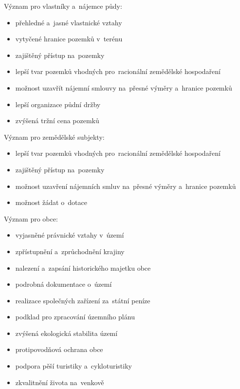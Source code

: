 Význam  pro vlastníky a~nájemce půdy:
\vspace{-\topsep}
	\begin{itemize}[leftmargin=1.5cm, noitemsep]
		\item přehledné a~jasné vlastnické vztahy
		\item vytyčené hranice pozemků v~terénu
		\item zajištěný přístup na~pozemky
		\item lepší tvar pozemků vhodných pro~racionální zemědělské hospodaření
		\item možnost uzavřít nájemní smlouvy na~přesné výměry a~hranice pozemků
		\item lepší organizace půdní držby
		\item zvýšená tržní cena pozemků
	\end{itemize}

Význam  pro zemědělské subjekty:
\vspace{-\topsep}
	\begin{itemize}[leftmargin=1.5cm, noitemsep]
		\item lepší tvar pozemků vhodných pro~racionální zemědělské hospodaření
		\item zajištěný přístup na~pozemky
		\item možnost uzavření nájemních smluv na~přesné výměry a~hranice pozemků
		\item možnost žádat o~dotace
	\end{itemize}

Význam  pro obce:
\vspace{-\topsep}
	\begin{itemize}[leftmargin=1.5cm, noitemsep]
		\item vyjasněné právnické vztahy v~území
		\item zpřístupnění a~zprůchodnění krajiny
		\item nalezení a~zapsání historického majetku obce
		\item podrobná dokumentace o~území
		\item realizace společných zařízení za~státní peníze
		\item podklad pro zpracování územního plánu
		\item zvýšená ekologická stabilita území
		\item protipovodňová ochrana obce
		\item podpora pěší turistiky a~cykloturistiky
		\item zkvalitnění života na~venkově
	\end{itemize}


